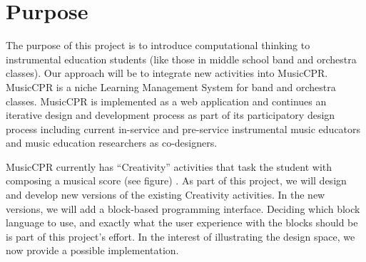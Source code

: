 \documentclass[manuscript,screen,review]{acmart}
\begin{document}
    


\section{Purpose}

The purpose of this project is to introduce computational thinking to instrumental education students (like those in middle school band and orchestra classes). Our approach will be to integrate new activities into MusicCPR. MusicCPR is a niche Learning Management System for band and orchestra classes. MusicCPR is implemented as a web application and continues an iterative design and development process as part of its participatory design process including current in-service and pre-service instrumental music educators and music education researchers as co-designers.

MusicCPR currently has ``Creativity'' activities that task the student with composing a musical score (see figure) . As part of this project, we will design and develop new versions of the existing Creativity activities. In the new versions, we will add a block-based programming interface. Deciding which block language to use, and exactly what the user experience with the blocks should be is part of this project's effort. In the interest of illustrating the design space, we now provide a possible implementation.
\end{document}
